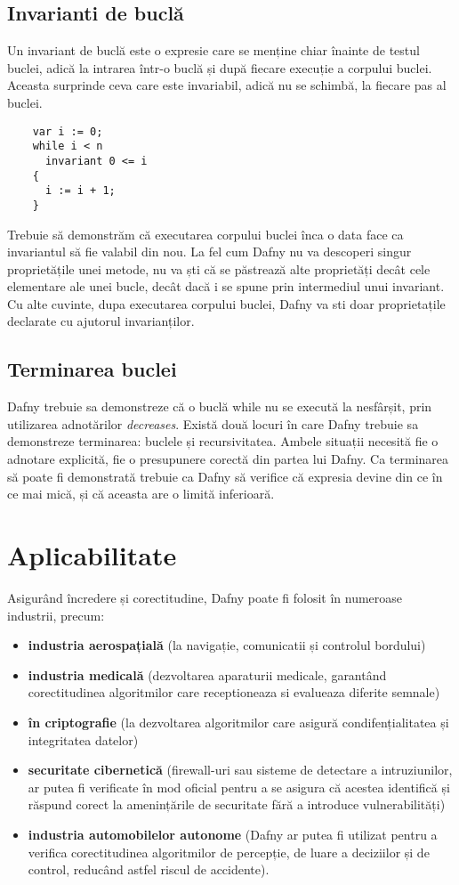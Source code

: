 \subsection{Invarianti de buclă}
Un invariant de buclă este o expresie care se menține chiar înainte de testul buclei, adică la intrarea într-o buclă și după fiecare execuție a corpului buclei. Aceasta surprinde ceva care este invariabil, adică nu se schimbă, la fiecare pas al buclei.
\begin{verbatim}
    var i := 0;
    while i < n
      invariant 0 <= i
    {
      i := i + 1;
    }
\end{verbatim}
Trebuie să demonstrăm că executarea corpului buclei înca o data face ca invariantul să fie valabil din nou. La fel cum Dafny nu va descoperi singur proprietățile unei metode, nu va ști că se păstrează alte proprietăți decât cele elementare ale unei bucle, decât dacă i se spune prin intermediul unui invariant. Cu alte cuvinte, dupa executarea corpului buclei, Dafny va sti doar proprietațile declarate cu ajutorul invarianților. 

\subsection{Terminarea buclei}
Dafny trebuie sa demonstreze că o buclă while nu se execută la nesfârșit, prin utilizarea adnotărilor \textit{decreases}. Există două locuri în care Dafny trebuie sa demonstreze terminarea: buclele și recursivitatea. Ambele situații necesită fie o adnotare explicită, fie o presupunere corectă din partea lui Dafny. Ca terminarea să poate fi demonstrată trebuie ca Dafny să verifice că expresia devine din ce în ce mai mică, și că aceasta are o limită inferioară. 


\section{Aplicabilitate}

Asigurând încredere și corectitudine, Dafny poate fi folosit în numeroase industrii, precum: 
\begin{itemize}
    \item \textbf{industria aerospațială} (la navigație, comunicatii și controlul bordului)
    \item \textbf{industria medicală} (dezvoltarea aparaturii medicale, garantând corectitudinea algoritmilor care receptioneaza si evalueaza diferite semnale)
    \item \textbf{în criptografie} (la dezvoltarea algoritmilor care asigură condifențialitatea și integritatea datelor)
    \item  \textbf{securitate cibernetică} (firewall-uri sau sisteme de detectare a intruziunilor, ar putea fi verificate în mod oficial pentru a se asigura că acestea identifică și răspund corect la amenințările de securitate fără a introduce vulnerabilități)
    \item \textbf{industria automobilelor autonome} (Dafny ar putea fi utilizat pentru a verifica corectitudinea algoritmilor de percepție, de luare a deciziilor și de control, reducând astfel riscul de accidente).
\end{itemize}
